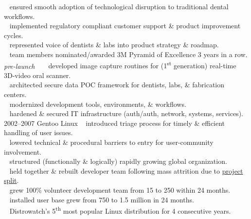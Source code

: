 \documentclass[]{friggeri-cv} %
\begin{document}
\begin{entrylist}
{{\tiny {}} ~ ensured smooth adoption of technological disruption to traditional dental workflows.\\
{\tiny {}} ~ implemented regulatory compliant customer support \& product improvement cycles.\\
{\tiny {}} ~ represented voice of dentists \& labs into product strategy \& roadmap.\\

{\tiny {}} ~ team members nominated/awarded 3M Pyramid of Excellence 3 years in a row.%
}
\entry
{\emph{pre-launch}}
{~}
{}
{{\tiny {}} ~ developed image capture routines for (1\textsuperscript{st} generation) real-time 3D-video oral scanner.\\
{\tiny {}} ~ architected secure data POC framework for dentists, labs, \& fabrication centers.\\
{\tiny {}} ~ modernized development tools, environments, \& workflows.\\
{\tiny {}} ~ hardened \& secured IT infrastructure (auth/auth, network, systems, services).\\}
\entry
{2002--2007}
{Gentoo Linux}
{}
{{\tiny {}} ~ introduced triage process for timely \& efficient handling of user issues.\\
{\tiny {}} ~ lowered technical \& procedural barriers to entry for user-community involvement.\\
{\tiny {}} ~ structured (functionally \& logically) rapidly growing global organization.\\

{\tiny {}} ~ held together \& rebuilt developer team following mass attrition due to \href{http://www.gentoo.org/news/en/gwn/20030630-newsletter.xml}{project split}.\\

{\tiny {}} ~ grew 100\% volunteer development team from 15 to 250 within 24 months.\\
{\tiny {}} ~ installed user base grew from 750 to 1.5 million in 24 months.\\
{\tiny {}} ~ Distrowatch's 5\textsuperscript{th} most popular Linux distribution for 4 consecutive years.}
\end{entrylist}
\end{document}
